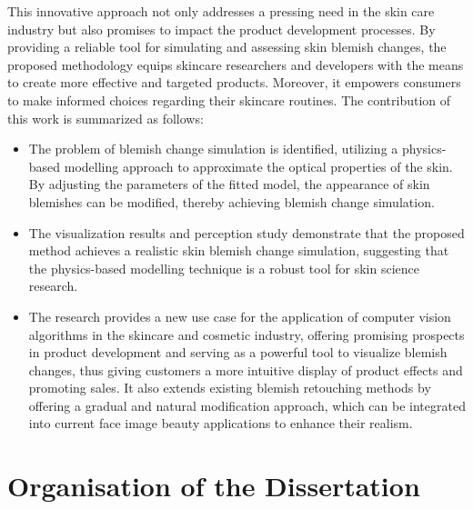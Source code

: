 \begin{spacing}{1.5}
This innovative approach not only addresses a pressing need in the skin care industry but also promises to impact the product development processes. By providing a reliable tool for simulating and assessing skin blemish changes, the proposed methodology equips skincare researchers and developers with the means to create more effective and targeted products. Moreover, it empowers consumers to make informed choices regarding their skincare routines. The contribution of this work is summarized as follows:
\begin{itemize}
    \item The problem of blemish change simulation is identified, utilizing a physics-based modelling approach to approximate the optical properties of the skin. By adjusting the parameters of the fitted model, the appearance of skin blemishes can be modified, thereby achieving blemish change simulation.
    \item The visualization results and perception study demonstrate that the proposed method achieves a realistic skin blemish change simulation, suggesting that the physics-based modelling technique is a robust tool for skin science research.
    \item The research provides a new use case for the application of computer vision algorithms in the skincare and cosmetic industry, offering promising prospects in product development and serving as a powerful tool to visualize blemish changes, thus giving customers a more intuitive display of product effects and promoting sales. It also extends existing blemish retouching methods by offering a gradual and natural modification approach, which can be integrated into current face image beauty applications to enhance their realism.
\end{itemize}

\section{Organisation of the Dissertation}


\end{spacing}
